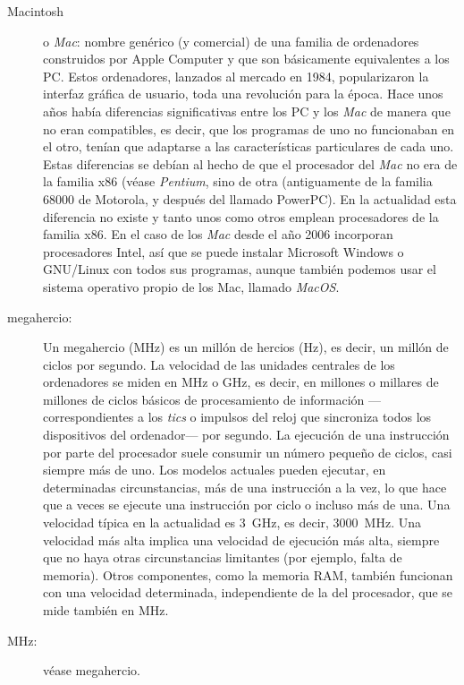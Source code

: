 \begin{description}
\item[Macintosh] o \emph{Mac}: nombre genérico (y comercial) de una familia de ordenadores construidos por Apple Computer y que son básicamente equivalentes a los PC. Estos ordenadores, lanzados al mercado en 1984, popularizaron la interfaz gráfica de usuario, toda una revolución para la época. Hace unos años había diferencias significativas entre los PC y los \emph{Mac} de manera que no eran compatibles, es decir, que los programas de uno no funcionaban en el otro, tenían que adaptarse a las características particulares de cada uno. Estas diferencias se debían al hecho de que el procesador del \emph{Mac} no era de la familia x86 (véase \emph{Pentium}, sino de otra (antiguamente de la familia 68000 de Motorola, y después del llamado PowerPC). En la actualidad esta diferencia no existe y tanto unos como otros emplean procesadores de la familia x86. En el caso de los \emph{Mac} desde el año 2006 incorporan procesadores Intel, así que se puede instalar Microsoft Windows o GNU/Linux con todos sus programas, aunque también podemos usar el sistema operativo propio de los Mac, llamado \emph{MacOS}. 

\item[megahercio:] Un megahercio (MHz) es un millón de hercios (Hz), es decir, un millón de ciclos por segundo. La velocidad de las unidades centrales de los ordenadores se miden en MHz o GHz, es decir, en millones o millares de millones de ciclos básicos de procesamiento de información ---correspondientes a los \emph{tics} o impulsos del reloj que sincroniza todos los dispositivos del ordenador--- por segundo. La ejecución de una instrucción por parte del procesador suele consumir un número pequeño de ciclos, casi siempre más de uno. Los modelos actuales pueden ejecutar, en determinadas circunstancias, más de una instrucción a la vez, lo que hace que a veces se ejecute una instrucción por ciclo o incluso más de una. Una velocidad típica en la actualidad es 3~GHz, es decir, 3000~MHz. Una velocidad más alta implica una velocidad de ejecución más alta, siempre que no haya otras circunstancias limitantes (por ejemplo, falta de memoria). Otros componentes, como la memoria RAM, también funcionan con una velocidad determinada, independiente de la del procesador, que se mide también en MHz. 

\item[MHz:] véase megahercio. 


\end{description}
